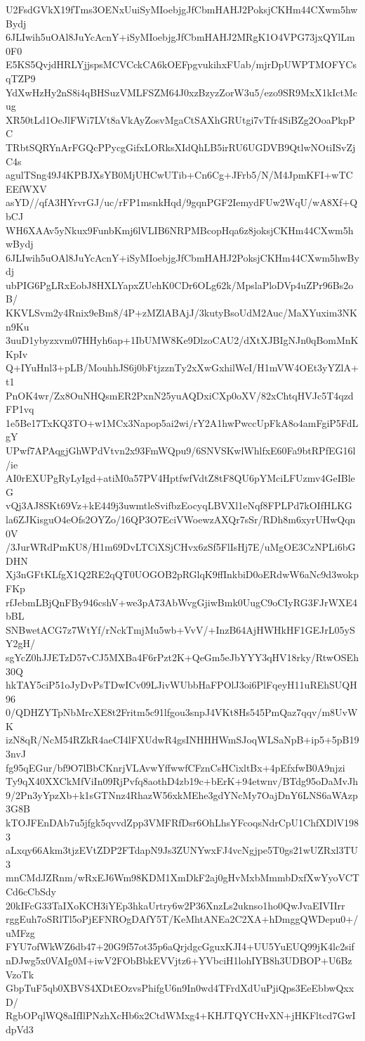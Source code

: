 U2FsdGVkX19fTms3OENxUuiSyMIoebjgJfCbmHAHJ2PoksjCKHm44CXwm5hwBydj
6JLIwih5uOAl8JuYcAcnY+iSyMIoebjgJfCbmHAHJ2MRgK1O4VPG73jxQYlLm0F0
E5KS5QvjdHRLYjjspsMCVCckCA6kOEFpgvukihxFUab/mjrDpUWPTMOFYCsqTZP9
YdXwHzHy2nS8i4qBHSuzVMLFSZM64J0xzBzyzZorW3u5/ezo9SR9MxX1kIctMcug
XR50tLd1OeJlFWi7LVt8aVkAyZosvMgaCtSAXhGRUtgi7vTfr4SiBZg2OoaPkpPC
TRbtSQRYnArFGQcPPycgGifxLORksXIdQhLB5irRU6UGDVB9QtlwNOtiISvZjC4s
agulTSng49J4KPBJXsYB0MjUHCwUTib+Cn6Cg+JFrb5/N/M4JpmKFI+wTCEEfWXV
asYD//qfA3HYrvrGJ/uc/rFP1msnkHqd/9gqnPGF2IemydFUw2WqU/wA8Xf+QbCJ
WH6XAAv5yNkux9FunbKmj6lVLIB6NRPMBcopHqa6z8joksjCKHm44CXwm5hwBydj
6JLIwih5uOAl8JuYcAcnY+iSyMIoebjgJfCbmHAHJ2PoksjCKHm44CXwm5hwBydj
ubPIG6PgLRxEobJ8HXLYapxZUehK0CDr6OLg62k/MpslaPloDVp4uZPr96Bs2oB/
KKVLSvm2y4Rnix9eBm8/4P+zMZlABAjJ/3kutyBsoUdM2Auc/MaXYuxim3NKn9Ku
3uuD1ybyzxvm07HHyh6ap+1IbUMW8Ke9DlzoCAU2/dXtXJBIgNJn0qBomMnKKpIv
Q+IYuHnl3+pLB/MouhhJS6j0bFtjzznTy2xXwGxhilWeI/H1mVW4OEt3yYZlA+t1
PnOK4wr/Zx8OuNHQsmER2PxnN25yuAQDxiCXp0oXV/82xChtqHVJc5T4qzdFP1vq
1e5Be17TxKQ3TO+w1MCx3Napop5ai2wi/rY2A1hwPwccUpFkA8o4amFgiP5FdLgY
UPwf7APAqgjGhWPdVtvn2x93FmWQpu9/6SNVSKwlWhlfxE60Fa9btRPfEG16l/ie
AI0rEXUPgRyLyIgd+atiM0a57PV4HptfwfVdtZ8tF8QU6pYMciLFUzmv4GeIBleG
vQj3AJ8SKt69Vz+kE449j3uwmtleSvifbzEocyqLBVXl1eNqf8FPLPd7kOIfHLKG
la6ZJKisguO4eOfs2OYZo/16QP3O7EciVWoewzAXQr7sSr/RDh8m6xyrUHwQqn0V
/3JurWRdPmKU8/H1m69DvLTCiXSjCHvx6zSf5FlIsHj7E/uMgOE3CzNPLi6bGDHN
Xj3nGFtKLfgX1Q2RE2qQT0UOGOB2pRGlqK9ffInkbiD0oERdwW6aNc9d3wokpFKp
rfJebmLBjQnFBy946cshV+we3pA73AbWvgGjiwBmk0UugC9oCIyRG3FJrWXE4bBL
SNBwetACG7z7WtYf/rNckTmjMu5wb+VvV/+InzB64AjHWHkHF1GEJrL05ySY2gH/
sgYcZ0hJJETzD57vCJ5MXBa4F6rPzt2K+QeGm5eJbYYY3qHV18rky/RtwOSEh30Q
hkTAY5ciP51oJyDvPsTDwICv09LJivWUbbHaFPOlJ3oi6PlFqeyH11uREhSUQH96
0/QDHZYTpNbMrcXE8t2Fritm5c91lfgou3snpJ4VKt8Hs545PmQaz7qqv/m8UvWK
izN8qR/NcM54RZkR4aeCI4lFXUdwR4gsINHHHWmSJoqWLSaNpB+ip5+5pB193nvJ
fg95qEGur/bf9O7lBbCKnrjVLAvwYffwwfCFznCsHCixltBx+4pEfxfwB0A9njzi
Ty9qX40XXCkMfViIn09RjPvfq8aothD4zb19c+bErK+94etwnv/BTdg95oDaMvJh
9/2Pn3yYpzXb+k1sGTNnz4RhazW56xkMEhe3gdYNcMy7OajDnY6LNS6aWAzp3G8B
kTOJFEnDAb7u5jfgk5qvvdZpp3VMFRfDsr6OhLhsYFcoqsNdrCpU1ChfXDlV1983
aLxqy66Akm3tjzEVtZDP2FTdapN9Js3ZUNYwxFJ4vcNgjpe5T0gs21wUZRxl3TU3
mnCMdJZRnm/wRxEJ6Wm98KDM1XmDkF2aj0gHvMxbMmmbDxfXwYyoVCTCd6cCbSdy
20kIFcG33TaIXoKCH3iYEp3hkaUrtry6w2P36XnzLs2uknso1ho0QwJvaEIVIIrr
rggEuh7oSRlTl5oPjEFNROgDAfY5T/KeMhtANEa2C2XA+hDmggQWDepu0+/uMFzg
FYU7ofWkWZ6db47+20G9f57ot35p6aQrjdgcGguxKJI4+UU5YuEUQ99jK4lc2sif
nDJwg5x0VAIg0M+iwV2FObBbkEVVjtz6+YVbciH1lohIYB8h3UDBOP+U6BzVzoTk
GbpTuF5qb0XBVS4XDtEOzvsPhifgU6n9In0wd4TFrdXdUuPjiQps3EeEbbwQxxD/
RgbOPqlWQ8aIfIlPNzhXcHb6x2CtdWMxg4+KHJTQYCHvXN+jHKFltcd7GwIdpVd3

